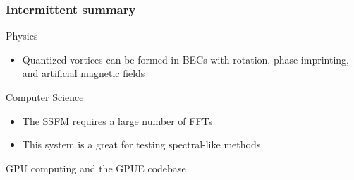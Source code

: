 \documentclass{beamer}
\begin{document}
\begin{frame}
\frametitle{Intermittent summary}
Physics
\begin{itemize}
\item Quantized vortices can be formed in BECs with rotation, phase imprinting, and artificial magnetic fields
\end{itemize}

\vspace{0.5cm}
\pause

Computer Science
\begin{itemize}
\item The SSFM requires a large number of FFTs
\item This system is a great for testing spectral-like methods
\end{itemize}

\end{frame}

\begin{frame}
\center \huge GPU computing and the GPUE codebase
\end{frame}
\end{document}
